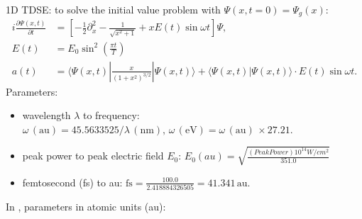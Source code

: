 \documentclass{isildur}
\begin{document}
1D TDSE: to solve the initial value problem with $\Psi(x,t=0)=\Psi_g(x)$:
%
\begin{align}
  i\frac{\partial \Psi(x,t)}{\partial t} &=
    \left[
      -\frac{1}{2}\partial^2_{x} - \frac{1}{\sqrt{x^2+1}} + xE(t)\sin\omega t
    \right]\Psi, \\
  E(t) &= E_{0}\sin^2(\frac{\pi t}{T}) \\
  a(t) &= \langle \Psi(x,t)|\frac{x}{(1+x^2)^{3/2}}|\Psi(x,t) \rangle
        + \langle \Psi(x,t)|\Psi(x,t) \rangle \cdot E(t)\sin\omega t.
    \label{e:a(t)}
\end{align}
%
Parameters:
%
\begin{itemize}

  \item wavelength $\lambda$ to frequency:
  $\omega \,\mathrm{(au)} = 45.5633525 / \lambda \,\mathrm{(nm)}, \,
  \omega \,\mathrm{(eV)} = \omega \,\mathrm{(au)}\, \times 27.21$.

  \item peak power to peak electric field $E_0$:
  $E_0(au)=\sqrt{\frac{(PeakPower) 10^{14}{W/cm^2}}{351.0}}$

  \item femtosecond (fs) to au: $\mathrm{fs} = \frac{100.0}{2.418884326505} =
  41.341 \,\mathrm{au}$.

\end{itemize}
%
In \cite{burnett_calculation_1992}, parameters in atomic units (au):
%
\end{document}
